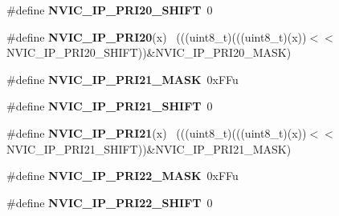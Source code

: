 \begin{DoxyCompactItemize}
\item 
\hypertarget{group___n_v_i_c___register___masks_gaed6e9caf4759aa282345ea3afe43d78e}{}\#define {\bfseries N\+V\+I\+C\+\_\+\+I\+P\+\_\+\+P\+R\+I20\+\_\+\+S\+H\+I\+F\+T}~0\label{group___n_v_i_c___register___masks_gaed6e9caf4759aa282345ea3afe43d78e}

\item 
\hypertarget{group___n_v_i_c___register___masks_ga211f3359ca4e345eb37541f7825b9a7d}{}\#define {\bfseries N\+V\+I\+C\+\_\+\+I\+P\+\_\+\+P\+R\+I20}(x)                                              ~(((uint8\+\_\+t)(((uint8\+\_\+t)(x))$<$$<$N\+V\+I\+C\+\_\+\+I\+P\+\_\+\+P\+R\+I20\+\_\+\+S\+H\+I\+F\+T))\&N\+V\+I\+C\+\_\+\+I\+P\+\_\+\+P\+R\+I20\+\_\+\+M\+A\+S\+K)\label{group___n_v_i_c___register___masks_ga211f3359ca4e345eb37541f7825b9a7d}

\item 
\hypertarget{group___n_v_i_c___register___masks_ga438a1e92dedcee01125619c45422e0d4}{}\#define {\bfseries N\+V\+I\+C\+\_\+\+I\+P\+\_\+\+P\+R\+I21\+\_\+\+M\+A\+S\+K}~0x\+F\+Fu\label{group___n_v_i_c___register___masks_ga438a1e92dedcee01125619c45422e0d4}

\item 
\hypertarget{group___n_v_i_c___register___masks_ga58e0b32333e793fc4153bc39370fad2e}{}\#define {\bfseries N\+V\+I\+C\+\_\+\+I\+P\+\_\+\+P\+R\+I21\+\_\+\+S\+H\+I\+F\+T}~0\label{group___n_v_i_c___register___masks_ga58e0b32333e793fc4153bc39370fad2e}

\item 
\hypertarget{group___n_v_i_c___register___masks_ga290365eb32fb18590fc9aea9132c996e}{}\#define {\bfseries N\+V\+I\+C\+\_\+\+I\+P\+\_\+\+P\+R\+I21}(x)                                              ~(((uint8\+\_\+t)(((uint8\+\_\+t)(x))$<$$<$N\+V\+I\+C\+\_\+\+I\+P\+\_\+\+P\+R\+I21\+\_\+\+S\+H\+I\+F\+T))\&N\+V\+I\+C\+\_\+\+I\+P\+\_\+\+P\+R\+I21\+\_\+\+M\+A\+S\+K)\label{group___n_v_i_c___register___masks_ga290365eb32fb18590fc9aea9132c996e}

\item 
\hypertarget{group___n_v_i_c___register___masks_gaa6f3ca1674cbd51bd26295dd67c9e99d}{}\#define {\bfseries N\+V\+I\+C\+\_\+\+I\+P\+\_\+\+P\+R\+I22\+\_\+\+M\+A\+S\+K}~0x\+F\+Fu\label{group___n_v_i_c___register___masks_gaa6f3ca1674cbd51bd26295dd67c9e99d}

\item 
\hypertarget{group___n_v_i_c___register___masks_gaed329bc0ce6bd355bef1b88b55cda40a}{}\#define {\bfseries N\+V\+I\+C\+\_\+\+I\+P\+\_\+\+P\+R\+I22\+\_\+\+S\+H\+I\+F\+T}~0\label{group___n_v_i_c___register___masks_gaed329bc0ce6bd355bef1b88b55cda40a}


\end{DoxyCompactItemize}
